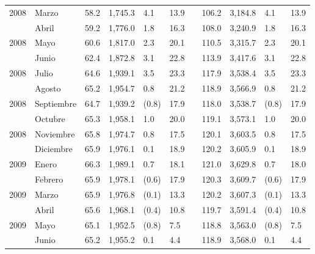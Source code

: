 \begin{center}
\begin{longtable}{llp{1.1cm}p{1.2cm}p{1.2cm}p{1.2cm}rp{1.2cm}p{1.2cm}p{1.2cm}p{1.2cm}}
		\multicolumn{1}{l}{	2008	}&	Marzo	&	 58.2 	&	 1,745.3 	&	 4.1 	&	 13.9 	&  &	 106.2 	&	 3,184.8 	&	 4.1 	&	 13.9 	\\
		\rowcolor{color1!5!white}\multicolumn{1}{l}{	2008	}&	Abril	&	 59.2 	&	 1,776.0 	&	 1.8 	&	 16.3 	&  &	 108.0 	&	 3,240.9 	&	 1.8 	&	 16.3 	\\
		\multicolumn{1}{l}{	2008	}&	Mayo	&	 60.6 	&	 1,817.0 	&	 2.3 	&	 20.1 	&  &	 110.5 	&	 3,315.7 	&	 2.3 	&	 20.1 	\\
		\rowcolor{color1!5!white}\multicolumn{1}{l}{	2008	}&	Junio	&	 62.4 	&	 1,872.8 	&	 3.1 	&	 22.8 	&  &	 113.9 	&	 3,417.6 	&	 3.1 	&	 22.8 	\\
		\multicolumn{1}{l}{	2008	}&	Julio	&	 64.6 	&	 1,939.1 	&	 3.5 	&	 23.3 	&  &	 117.9 	&	 3,538.4 	&	 3.5 	&	 23.3 	\\
		\rowcolor{color1!5!white}\multicolumn{1}{l}{	2008	}&	Agosto	&	 65.2 	&	 1,954.7 	&	 0.8 	&	 21.2 	&  &	 118.9 	&	 3,566.9 	&	 0.8 	&	 21.2 	\\
		\multicolumn{1}{l}{	2008	}&	Septiembre	&	 64.7 	&	 1,939.2 	&	 (0.8)	&	 17.9 	&  &	 118.0 	&	 3,538.7 	&	 (0.8)	&	 17.9 	\\
		\rowcolor{color1!5!white}\multicolumn{1}{l}{	2008	}&	Octubre	&	 65.3 	&	 1,958.1 	&	 1.0 	&	 20.0 	&  &	 119.1 	&	 3,573.1 	&	 1.0 	&	 20.0 	\\
		\multicolumn{1}{l}{	2008	}&	Noviembre	&	 65.8 	&	 1,974.7 	&	 0.8 	&	 17.5 	&  &	 120.1 	&	 3,603.5 	&	 0.8 	&	 17.5 	\\
		\rowcolor{color1!5!white}\multicolumn{1}{l}{	2008	}&	Diciembre	&	 65.9 	&	 1,976.1 	&	 0.1 	&	 18.9 	&  &	 120.2 	&	 3,605.9 	&	 0.1 	&	 18.9 	\\
		\multicolumn{1}{l}{	2009	}&	Enero	&	 66.3 	&	 1,989.1 	&	 0.7 	&	 18.1 	&  &	 121.0 	&	 3,629.8 	&	 0.7 	&	 18.0 	\\
		\rowcolor{color1!5!white}\multicolumn{1}{l}{	2009	}&	Febrero	&	 65.9 	&	 1,978.1 	&	 (0.6)	&	 17.9 	&  &	 120.3 	&	 3,609.7 	&	 (0.6)	&	 17.9 	\\
		\multicolumn{1}{l}{	2009	}&	Marzo	&	 65.9 	&	 1,976.8 	&	 (0.1)	&	 13.3 	&  &	 120.2 	&	 3,607.3 	&	 (0.1)	&	 13.3 	\\
		\rowcolor{color1!5!white}\multicolumn{1}{l}{	2009	}&	Abril	&	 65.6 	&	 1,968.1 	&	 (0.4)	&	 10.8 	&  &	 119.7 	&	 3,591.4 	&	 (0.4)	&	 10.8 	\\
		\multicolumn{1}{l}{	2009	}&	Mayo	&	 65.1 	&	 1,952.5 	&	 (0.8)	&	 7.5 	&  &	 118.8 	&	 3,563.0 	&	 (0.8)	&	 7.5 	\\
		\rowcolor{color1!5!white}\multicolumn{1}{l}{	2009	}&	Junio	&	 65.2 	&	 1,955.2 	&	 0.1 	&	 4.4 	&  &	 118.9 	&	 3,568.0 	&	 0.1 	&	 4.4 	\\

\end{longtable}
\end{center}
